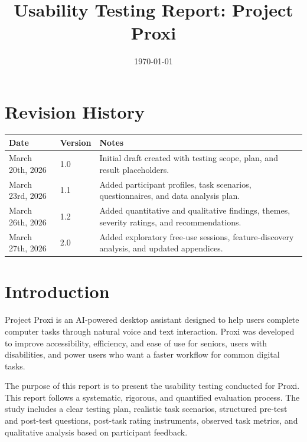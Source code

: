 \documentclass[12pt, titlepage]{article}
\begin{document}
\hypersetup{pageanchor=false}

\title{Usability Testing Report: Project Proxi}
\author{\authname}
\date{\today}

\maketitle


\section{Revision History}

\begin{tabularx}{\textwidth}{p{3cm}p{2cm}X}
\toprule
{\bf Date} & {\bf Version} & {\bf Notes}\\
\midrule
March 20th, 2026 & 1.0 &
Initial draft created with testing scope, plan, and result
placeholders.\\
March 23rd, 2026 & 1.1 &
Added participant profiles, task scenarios, questionnaires,
and data analysis plan.\\
March 26th, 2026 & 1.2 &
Added quantitative and qualitative findings, themes,
severity ratings, and recommendations.\\
March 27th, 2026 & 2.0 &
Added exploratory free-use sessions, feature-discovery
analysis, and updated appendices.\\
\bottomrule
\end{tabularx}

\newpage

\tableofcontents

\newpage

\hypersetup{pageanchor=true}

\section{Introduction}

Project Proxi is an AI-powered desktop assistant designed to help users
complete computer tasks through natural voice and text interaction.
Proxi was developed to improve accessibility, efficiency, and ease of
use for seniors, users with disabilities, and power users who want a
faster workflow for common digital tasks.

The purpose of this report is to present the usability testing
conducted for Proxi. This report follows a systematic, rigorous, and
quantified evaluation process. The study includes a clear testing plan,
realistic task scenarios, structured pre-test and post-test questions,
post-task rating instruments, observed task metrics, and qualitative
analysis based on participant feedback.
\end{document}
